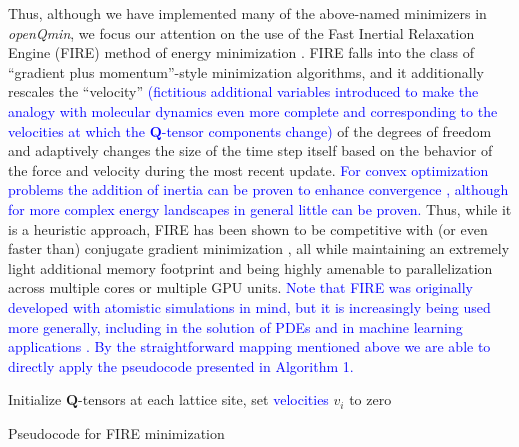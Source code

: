 \documentclass[utf8]{frontiersFPHY} %
\newcommand{\DAB}[1]{\textcolor{blue}{#1}}
\newcommand{\DMS}[1]{\textcolor{blue}{#1}}
\newcommand{\Q}{\mathbf{Q}}
\def\PackageName{\textit{openQmin}}
\begin{document}

Thus, although we have implemented many of the above-named minimizers in \PackageName, we 
focus our attention on the use of the Fast Inertial Relaxation Engine (FIRE) method of energy minimization \citep{bitzek2006structural}. FIRE falls into the class of ``gradient plus momentum''-style minimization algorithms, and it additionally rescales the ``velocity'' \DMS{(fictitious additional variables introduced to make the analogy with molecular dynamics even more complete and corresponding to the velocities at which the $\Q$-tensor components change)} of the degrees of freedom and adaptively changes the size of the time step itself based on the behavior of the force and velocity during the most recent update. \DMS{For convex optimization problems the addition of inertia can be proven to enhance convergence \cite{polyak1964some}, although for more complex energy landscapes in general little can be proven.} Thus, while it is a heuristic approach, FIRE has been shown to be competitive with (or even faster than) conjugate gradient minimization \citep{bitzek2006structural,sheppard2008optimization,herbol2017computational}, all while maintaining an extremely light additional memory footprint and being highly  amenable to parallelization across multiple cores or multiple GPU units. \DMS{Note that FIRE was originally developed with atomistic simulations in mind, but it is increasingly being used more generally, including in the solution of PDEs \cite{zhou2019solution} and in machine learning applications \cite{wang2019search}. By the straightforward mapping mentioned above we are able to directly apply the pseudocode presented in Algorithm 1.}

\begin{algorithm}[H]
Initialize $\Q$-tensors at each lattice site, set \DAB{velocities} $v_i$ to zero\;
 \caption{Pseudocode for FIRE minimization \citep{bitzek2006structural} }
\end{algorithm}
\end{document}
